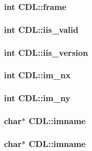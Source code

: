 \subsubsection{\setlength{\rightskip}{0pt plus 5cm}int \bf{CDL::frame}}\label{structCDL_8de296a25ea05d023c1107492370fb10}


\subsubsection{\setlength{\rightskip}{0pt plus 5cm}int \bf{CDL::iis\_\-valid}}\label{structCDL_4bae9fecabfe141251dfad00afc53166}


\subsubsection{\setlength{\rightskip}{0pt plus 5cm}int \bf{CDL::iis\_\-version}}\label{structCDL_7fb06df6caddde094814eab40487942c}


\subsubsection{\setlength{\rightskip}{0pt plus 5cm}int \bf{CDL::im\_\-nx}}\label{structCDL_acf97c5cc0781282c52de437043ec0b9}


\subsubsection{\setlength{\rightskip}{0pt plus 5cm}int \bf{CDL::im\_\-ny}}\label{structCDL_0f3346dba3637c49d7acf5fbf9cc5224}


\subsubsection{\setlength{\rightskip}{0pt plus 5cm}char$\ast$ \bf{CDL::imname}}\label{structCDL_f095afccb96bbd82d4c1c153f768af2e}


\subsubsection{\setlength{\rightskip}{0pt plus 5cm}char$\ast$ \bf{CDL::imname}}\label{structCDL_f095afccb96bbd82d4c1c153f768af2e}


